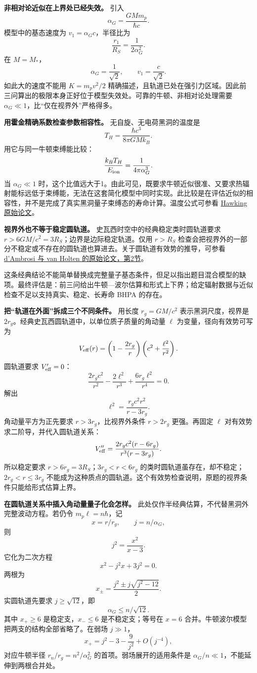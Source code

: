 \documentclass[12pt,a4paper,UTF8]{ctexart}
\begin{document}
\textbf{非相对论近似在上界处已经失效。} 引入 \[
\alpha_G=\frac{GMm_p}{\hbar c}.
\] 模型中的基态速度为 \(v_1=\alpha_Gc\)，半径比为 \[
\frac{r_1}{R_S}=\frac{1}{2\alpha_G^2}.
\] 在 \(M=M_*\)， \[
\alpha_G=\frac1{\sqrt2},\qquad v_1=\frac c{\sqrt2}.
\] 如此大的速度不能用 \(K=m_pv^2/2\)
精确描述，且轨道已处在强引力区域。因此前三问算出的极限本身正好位于模型失效处。可靠的牛顿、非相对论处理需要
\(\alpha_G\ll1\)，比``仅在视界外''严格得多。

\textbf{用霍金精确系数检查参数相容性。} 无自旋、无电荷黑洞的温度是 \[
T_H=\frac{\hbar c^3}{8\pi G M k_B}.
\] 用它与同一牛顿束缚能比较： \[
\frac{k_BT_H}{E_{\rm ion}}
=\frac{1}{4\pi\alpha_G^3}.
\] 当 \(\alpha_G\ll1\)
时，这个比值远大于1。由此可见，既要求牛顿近似很准、又要求热辐射能标远低于束缚能，无法在这套简化模型中同时实现。此比较是在评估近似的相容性，并不是完成了真实黑洞量子束缚态的寿命计算。温度公式可参看
\href{https://astrofrelat.fcaglp.unlp.edu.ar/agujeros_negros/media/Papers/Hawking_1975-Particle_creation_by_black_holes.pdf}{Hawking
原始论文}。

\textbf{视界外也不等于稳定圆轨道。} 史瓦西时空中的经典稳定类时圆轨道要求
\(r>6GM/c^2=3R_S\)；边界是边际稳定轨道。仅用 \(r>R_S\)
检查会把视界外的一部分不稳定或不存在的圆轨道也算进去。关于圆轨道有效势的推导，可参看
\href{https://arxiv.org/pdf/1406.4282}{d'Ambrosi 与 van Holten
的原始论文，第2节}。

这条经典结论不能简单替换成完整量子基态条件，但足以指出题目混合模型的缺项。最终评估是：前三问给出牛顿---波尔估算和形式上下界；给定辐射数据与近似检查不足以支持真实、稳定、长寿命
BHPA 的存在。

\textbf{把``轨道在外面''拆成三个不同条件。} 用长度 \(r_g=GM/c^2\)
表示黑洞尺度，视界是
\(2r_g\)。经典史瓦西圆轨道中，以单位质子质量的角动量 \(\ell\)
为变量，径向有效势可写为 \[
V_{\rm eff}(r)=
\left(1-\frac{2r_g}{r}\right)
\left(c^2+\frac{\ell^2}{r^2}\right).
\] 圆轨道要求 \(V_{\rm eff}'=0\)： \[
\frac{2r_gc^2}{r^2}
-\frac{2\ell^2}{r^3}
+\frac{6r_g\ell^2}{r^4}=0.
\] 解出 \[
\boxed{\ell^2=\frac{r_gc^2r^2}{r-3r_g}}.
\] 角动量平方为正先要求 \(r>3r_g\)，比视界外条件 \(r>2r_g\) 更强。再固定
\(\ell\) 对有效势求二阶导，并代入圆轨道关系： \[
V_{\rm eff}''=
\frac{2r_gc^2(r-6r_g)}
{r^3(r-3r_g)}.
\] 所以稳定要求 \(r>6r_g=3R_S\)；\(3r_g<r<6r_g\)
的类时圆轨道虽存在，却不稳定；\(2r_g<r\le3r_g\)
不能成为这种质点的圆轨道。这个有效势检查说明，原题的视界条件只能给形式估算上界。

\textbf{在圆轨道关系中插入角动量量子化会怎样。}
此处仅作半经典估算，不代替黑洞外完整波动方程。若仍令
\(m_p\ell=n\hbar\)，记 \[
x=r/r_g,\qquad j=n/\alpha_G,
\] 则 \[
j^2=\frac{x^2}{x-3}.
\] 它化为二次方程 \[
x^2-j^2x+3j^2=0.
\] 两根为 \[
x_\pm=\frac{j^2\pm j\sqrt{j^2-12}}2.
\] 实圆轨道先要求 \(j\ge\sqrt{12}\)，即 \[
\alpha_G\le n/\sqrt{12}.
\] 其中 \(x_+\ge6\) 是稳定支，\(x_-\le6\) 是不稳定支；等号在 \(x=6\)
合并。牛顿波尔模型把两支的结构全部省略了。在弱场 \(j\gg1\)， \[
x_+=j^2-3-\frac9{j^2}+O(j^{-4}),
\] 对应牛顿半径 \(r_n/r_g=n^2/\alpha_G^2\) 的首项。弱场展开的适用条件是
\(\alpha_G/n\ll1\)，不能延伸到两根合并处。
\end{document}
